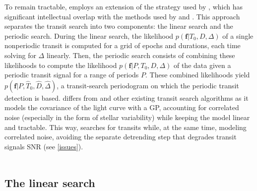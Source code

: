 \documentclass[modern]{aastex631}
\begin{document}
To remain tractable, \nuancemethod{} employs an extension of the strategy used by \cite{foreman2016}, which has significant intellectual overlap with the methods used by \cite{Aigrain2004} and \cite{Jenkins2010}. This approach separates the transit search into two components: the linear search and the periodic search. During the linear search, the likelihood $p(\bm{f} \vert T_0, D, \Delta)$ of a single nonperiodic transit is computed for a grid of epochs and durations, each time solving for $\Delta$ linearly. Then, the periodic search consists of combining these likelihoods to compute the likelihood $p(\bm{f} \vert P, T_0, D, \Delta)$ of the data given a periodic transit signal for a range of periods $P$. These combined likelihoods yield $p(\bm{f} \vert P, \hat T_0 ,\hat D, \hat \Delta)$, a transit-search periodogram on which the periodic transit detection is based. \nuancemethod{} differs from \cite{foreman2016} and other existing transit search algorithms as it models the covariance of the light curve with a GP, accounting for correlated noise (especially in the form of stellar variability) while keeping the model linear and tractable. This way, \nuancemethod{} searches for transits while, at the same time, modeling correlated noise, avoiding the separate detrending step that degrades transit signals SNR (see \autoref{issues}).\\\\

\subsection{The linear search}\label{linear_search}
\end{document}
